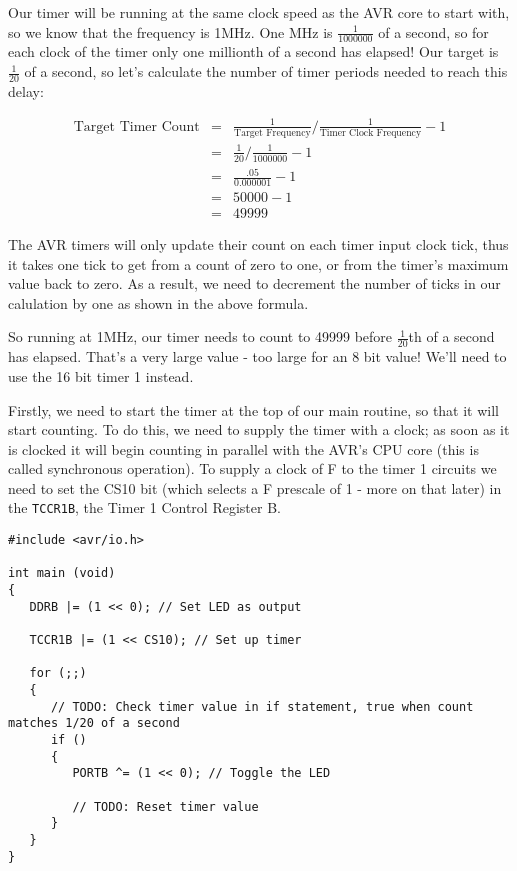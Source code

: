 \documentclass[a4paper,oneside,notitlepage]{book}
\begin{document}
Our timer will be running at the same clock speed as the AVR core to start with, so we know that the frequency is 1MHz. One MHz is \(\frac{1}{1000000}\) of a second, so for each clock of the timer only one millionth of a second has elapsed! Our target is \(\frac{1}{20}\) of a second, so let's calculate the number of timer periods needed to reach this delay:

\begin{displaymath}
\begin{array}{rcl}
\text{Target Timer Count} & = & \frac{1}{\text{Target Frequency}} / \frac{1}{\text{Timer Clock Frequency}} - 1 \\
                          & = & \frac{1}{20} / \frac{1}{1000000} - 1 \\
                          & = & \frac{.05}{0.000001} - 1 \\
                          & = & 50000 - 1 \\
                          & = & 49999
\end{array}
\end{displaymath}

The AVR timers will only update their count on each timer input clock tick, thus it takes one tick to get from a count of zero to one, or from the timer's maximum value back to zero. As a result, we need to decrement the number of ticks in our calulation by one as shown in the above formula.

So running at 1MHz, our timer needs to count to 49999 before \(\frac{1}{20}\)th of a second has elapsed. That's a very large value - too large for an 8 bit value! We'll need to use the 16 bit timer 1 instead.

Firstly, we need to start the timer at the top of our main routine, so that it will start counting. To do this, we need to supply the timer with a clock; as soon as it is clocked it will begin counting in parallel with the AVR's CPU core (this is called synchronous operation). To supply a clock of F to the timer 1 circuits we need to set the CS10 bit (which selects a F prescale of 1 - more on that later) in the \texttt{TCCR1B}, the Timer 1 Control Register B. 

\begin{center}
\begin{lstlisting}
#include <avr/io.h>

int main (void)
{
   DDRB |= (1 << 0); // Set LED as output

   TCCR1B |= (1 << CS10); // Set up timer

   for (;;)
   {
      // TODO: Check timer value in if statement, true when count matches 1/20 of a second
      if ()
      {
         PORTB ^= (1 << 0); // Toggle the LED

         // TODO: Reset timer value
      }
   }
} 
\end{lstlisting}
\end{center}
\end{document}
